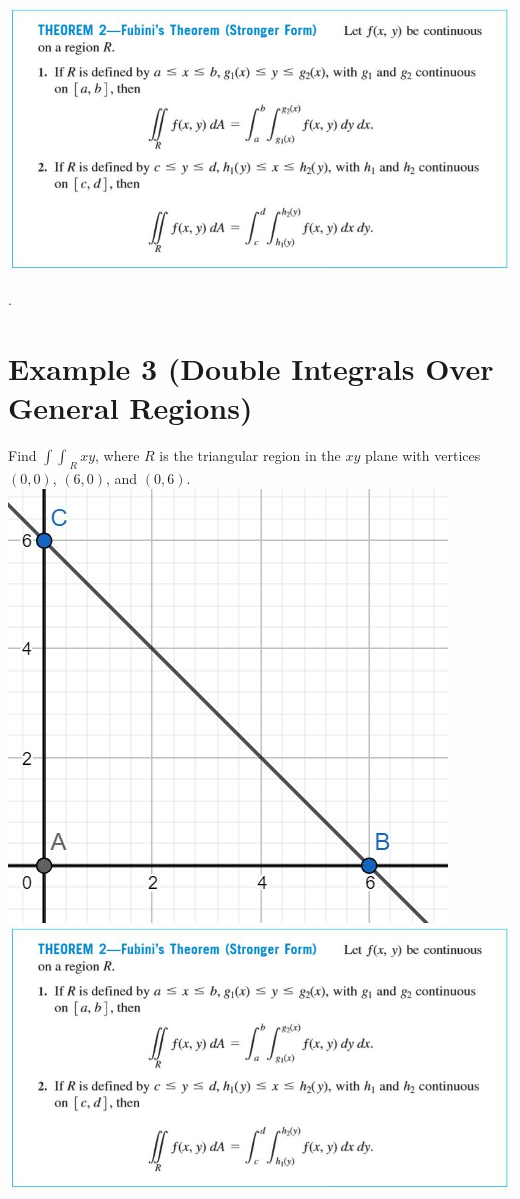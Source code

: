 \documentclass[11pt]{article}
\begin{document}
\includegraphics{Capture2.jpg}



\newpage

.

\newpage

\section*{Example 3 (Double Integrals Over General Regions)}

Find $\int \int_{\; R} xy$, where $R$ is the triangular region in the $xy$ plane with vertices $(0,0)$, $(6,0)$, and $(0,6)$. \\

\includegraphics{Capture3.jpg}\\
\includegraphics{Capture2.jpg}\\
\end{document}
